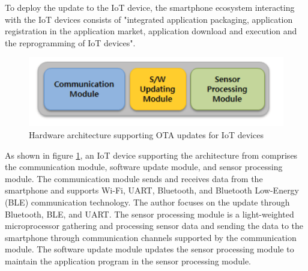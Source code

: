 \documentclass[12pt,a4paper]{article}
\begin{document}
To deploy the update to the IoT device, the smartphone ecosystem interacting with the IoT devices consists of "integrated application packaging, application registration in the application market, application download and execution and the reprogramming of IoT devices". \cite{r29} \\

\begin{figure}[H]
\centering
\includegraphics[scale=1]{hardware_architecture_r4.PNG}
\caption{Hardware architecture supporting OTA updates for IoT devices \cite{r29}}
\label{hardware_architecture_r4}
\end{figure}

As shown in figure \ref{hardware_architecture_r4}, an IoT device supporting the architecture from \cite{r29} comprises the communication module, software update module, and sensor processing module. The communication module sends and receives data from the smartphone and supports Wi-Fi, UART, Bluetooth, and Bluetooth Low-Energy (BLE) communication technology. The author focuses on the update through Bluetooth, BLE, and UART. The sensor processing module is a light-weighted microprocessor gathering and processing sensor data and sending the data to the smartphone through communication channels supported by the communication module. The software update module updates the sensor processing module to maintain the application program in the sensor processing module. \cite{r29} \\
\end{document}
